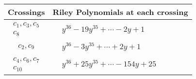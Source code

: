 \documentclass[1p]{elsarticle_modified}
\theoremstyle{definition}
\begin{document}
\begin{tabular}{m{50pt}|m{274pt}}
Crossings & \hspace{64pt}Riley Polynomials at each crossing \\
\hline $$\begin{aligned}c_{1},c_{3},c_{5}\\c_{8}\end{aligned}$$&$\begin{aligned}
&y^{36}-19 y^{35}+\cdots-2 y+1
\end{aligned}$\\
\hline $$\begin{aligned}c_{2},c_{9}\end{aligned}$$&$\begin{aligned}
&y^{36}-3 y^{35}+\cdots+2 y+1
\end{aligned}$\\
\hline $$\begin{aligned}c_{4},c_{6},c_{7}\\c_{10}\end{aligned}$$&$\begin{aligned}
&y^{36}+25 y^{35}+\cdots-154 y+25
\end{aligned}$\\
\hline
\end{tabular}
\vskip 2pc
\end{document}
